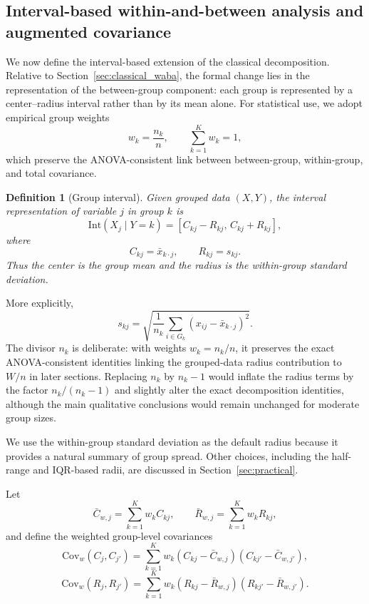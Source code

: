 \documentclass[preprint, times, 12pt, authoryear]{elsarticle}
\newtheorem{definition}{Definition}
\begin{document}
\subsection{Interval-based within-and-between analysis and augmented covariance}\label{sec:iwaba}

We now define the interval-based extension of the classical decomposition. Relative to Section~\ref{sec:classical_waba}, the formal change lies in the representation of the between-group component: each group is represented by a center--radius interval rather than by its mean alone. For statistical use, we adopt empirical group weights
\[
w_k=\frac{n_k}{n}, \qquad \sum_{k=1}^K w_k=1,
\]
which preserve the ANOVA-consistent link between between-group, within-group, and total covariance.

\begin{definition}[Group interval]\label{def:group_interval}
	Given grouped data $(X,Y)$, the interval representation of variable $j$ in group $k$ is
	\begin{equation}\label{eq:group_interval}
		\mathrm{Int}(X_j\mid Y=k)=[C_{kj}-R_{kj},\,C_{kj}+R_{kj}],
	\end{equation}
	where
	\[
	C_{kj}=\bar{x}_{k\cdot j},
	\qquad
	R_{kj}=s_{kj}.
	\]
	Thus the center is the group mean and the radius is the within-group standard deviation.
\end{definition}

More explicitly,
\[
s_{kj}=\sqrt{\frac{1}{n_k}\sum_{i\in G_k}(x_{ij}-\bar x_{k\cdot j})^2}.
\]
The divisor $n_k$ is deliberate: with weights $w_k=n_k/n$, it preserves the exact ANOVA-consistent identities linking the grouped-data radius contribution to $W/n$ in later sections. Replacing $n_k$ by $n_k-1$ would inflate the radius terms by the factor $n_k/(n_k-1)$ and slightly alter the exact decomposition identities, although the main qualitative conclusions would remain unchanged for moderate group sizes.

We use the within-group standard deviation as the default radius because it provides a natural summary of group spread. Other choices, including the half-range and IQR-based radii, are discussed in Section~\ref{sec:practical}.

Let
\[
\bar C_{w,j}=\sum_{k=1}^K w_k C_{kj},
\qquad
\bar R_{w,j}=\sum_{k=1}^K w_k R_{kj},
\]
and define the weighted group-level covariances
\[
\mathrm{Cov}_w(C_j,C_{j'})
=
\sum_{k=1}^K w_k(C_{kj}-\bar C_{w,j})(C_{kj'}-\bar C_{w,j'}),
\]
\[
\mathrm{Cov}_w(R_j,R_{j'})
=
\sum_{k=1}^K w_k(R_{kj}-\bar R_{w,j})(R_{kj'}-\bar R_{w,j'}).
\]
\end{document}
